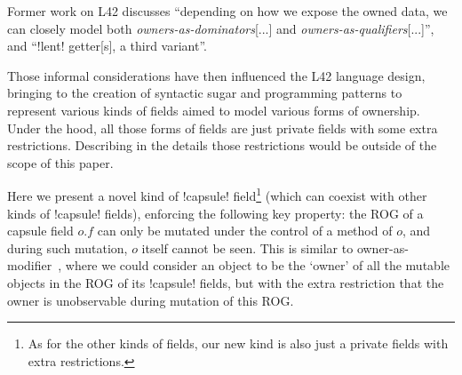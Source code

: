 


Former work on L42 discusses ``depending on how we expose the owned data, we can closely model both \emph{owners-as-dominators}[...] and \emph{owners-as-qualifiers}[...]''\cite{GIANNINI2019145}, and  ``\Q!lent! getter[s], a third variant''\cite{GIANNINI2019145}.%

Those informal considerations have then influenced the L42 language design,
bringing to the creation of syntactic sugar and programming patterns to represent various kinds of \Q@capsule@ fields aimed to model various forms of ownership. Under the hood, all those forms of \Q@capsule@ fields are just private \Q@mut@ fields with some extra restrictions. Describing in the details those restrictions would be outside of the scope of this paper.

Here we present a novel kind of \Q!capsule! field\footnote{As for the other kinds of \Q@capsule@ fields, our new kind is also just 
a private \Q@mut@ fields with extra restrictions.} (which can coexist with other kinds of \Q!capsule! fields),
enforcing the following key property:
the ROG of a capsule field $o.f$ can only be mutated under the control of a \Q@mut@ method of $o$, and during such mutation, $o$ itself cannot be seen.
This is similar to owner-as-modifier~\cite{Dietl05universes:lightweight,10.1007/978-3-540-92188-2_4}, 
where we could consider an object to be the `owner' of all the mutable objects in the ROG of its \Q!capsule! fields, but with the extra restriction that the owner is unobservable during mutation of this ROG.

